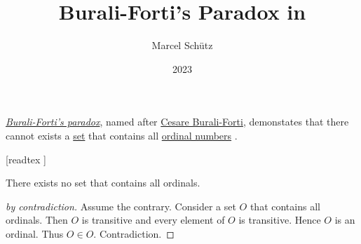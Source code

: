 \documentclass[english]{article}
\begin{document}
\title{Burali-Forti's Paradox in \Naproche}
\author{Marcel Schütz}
\date{2023}
\maketitle

\noindent \href{https://en.wikipedia.org/wiki/Burali-Forti_paradox}{\emph{Burali-Forti's paradox}}, named after \href{https://en.wikipedia.org/wiki/Cesare_Burali-Forti}{Cesare Burali-Forti}, demonstates that there cannot exists a \href{https://en.wikipedia.org/wiki/Set_(mathematics)}{set} that contains all \href{https://en.wikipedia.org/wiki/Ordinal_number}{ordinal numbers} \cite{BuraliForti1897}.

\begin{forthel}
  [readtex ]

  \begin{theorem*}\label{burali_forti_paradox}
    There exists no set that contains all ordinals.
  \end{theorem*}
  \begin{proof}[by contradiction]
    Assume the contrary.
    Consider a set $O$ that contains all ordinals.
    Then $O$ is transitive and every element of $O$ is transitive.
    Hence $O$ is an ordinal.
    Thus $O \in O$.
    Contradiction.
  \end{proof}
\end{forthel}

\printbibliography
\vfill
\doclicenseThis
\end{document}
